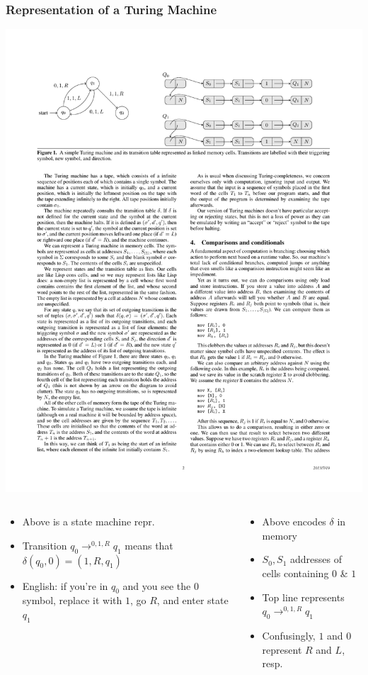 \documentclass{beamer}
\begin{document}
\begin{frame}[fragile]
\frametitle{Representation of a Turing Machine}

\begin{center}
\includegraphics[scale=0.6]{figures/TMrepresentation}
\end{center}
\begin{columns}
\begin{column}{2.35in}
\begin{itemize}
\item Above is a state machine repr. 
\pause
\item Transition $q_0 \longrightarrow^{0,1,R} q_1$  means
that $\delta (q_0,0) = (1,R,q_1)$
\pause
\item English: if you're in $q_0$ and you see the $0$ symbol, replace it with $1$, go $R$, and enter state $q_1$
      \pause
\end{itemize}
\end{column}
\begin{column}{2.35in}
\begin{itemize}
\item Above encodes $\delta$ in memory
\pause
\item $S_0, S_1$ addresses of cells containing $0$ \& $1$
\pause
\item Top line represents $q_0 \longrightarrow^{0,1,R} q_1$
\item Confusingly, $1$ and $0$ represent $R$ and $L$, resp.

\end{itemize}
\end{column}
\end{columns}
\end{frame}
\end{document}
